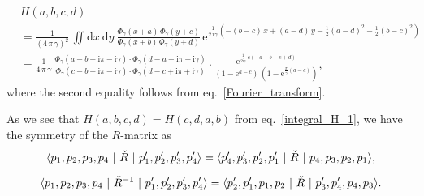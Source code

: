 \documentclass[12pt]{article}
\numberwithin{equation}{section}
\begin{document}
\begin{subequations}
  \label{integral_H}
  \begin{align}
    & H(a,b,c,d)
    \nonumber   \\
    & =
    \frac{1}{(4 \, \pi \, \gamma)^2} \,
    \iint \mathrm{d} x \ \mathrm{d} y \
    \frac{
      \Phi_\gamma(x+a) \, \Phi_\gamma(y+c)
      }{
      \Phi_\gamma(x+b) \, \Phi_\gamma(y+d)
      } \,
    \mathrm{e}^{ \frac{1}{2 \,  \mathrm{i} \, \gamma}
      \left(
        -(b-c) \,x + (a-d) \, y - \frac{1}{2}(a-d)^2 - \frac{1}{2}(b-c)^2
      \right)
      }
    \label{integral_H_1}
    \\
    & =
    \frac{1}{4 \, \pi \, \gamma} \,
    \frac{
      \Phi_\gamma(a - b - \mathrm{i} \pi - \mathrm{i} \gamma)
      \cdot
      \Phi_\gamma(d - a + \mathrm{i} \pi + \mathrm{i} \gamma)
      }{
      \Phi_\gamma(c - b - \mathrm{i} \pi - \mathrm{i} \gamma)
      \cdot
      \Phi_\gamma(d - c + \mathrm{i} \pi + \mathrm{i} \gamma)
      }
    \cdot
    \frac{
      \mathrm{e}^{
        \frac{1}{2 \mathrm{i} \gamma} \,
        c( -a+b-c+d)
        }
      }{
      (1- \mathrm{e}^{a-c}) \,
      (1 - \mathrm{e}^{\frac{\pi}{\gamma}(a-c)})
      } ,
  \end{align}
\end{subequations}
where the second equality follows from eq.~\eqref{Fourier_transform}.

As we see that
$H(a,b,c,d) = H(c,d,a,b)$ from eq.~\eqref{integral_H_1}, we have  the
symmetry of the $R$-matrix as
\begin{subequations}
  \label{symmetry_R}
  \begin{gather}
    \langle p_1, p_2 , p_3 , p_4 \ | \  \Check{R} \
    | \  p_1^\prime , p_2^\prime , p_3^\prime , p_4^\prime \rangle
    =
    \langle p_4^\prime , p_3^\prime , p_2^\prime , p_1^\prime \
    | \ \Check{R} \ | \
    p_4 , p_3 , p_2 , p_1 \rangle ,
    \label{R_and_R}
    \\[2mm]
%
    \langle p_1, p_2 , p_3 , p_4 \  | \ \Check{R}^{-1} \
    | \ p_1^\prime , p_2^\prime , p_3^\prime , p_4^\prime \rangle
    =
    \langle
    p_2^\prime , p_1^\prime, p_1 , p_2 \  | \  \Check{R} \  | \
    p_3^\prime , p_4^\prime , p_4 , p_3 \rangle .
    \label{R_and_R_inv}
  \end{gather}
\end{subequations}
\end{document}
